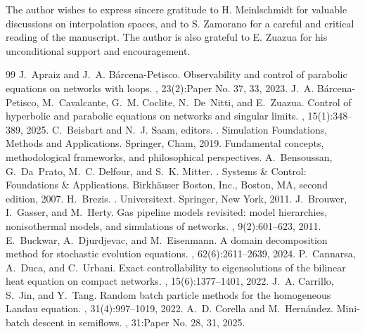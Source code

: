 \documentclass[10pt,a4paper]{amsart}
\begin{document}
The author wishes to express sincere gratitude to H. Meinlschmidt for valuable discussions on interpolation spaces, and to S. Zamorano for a careful and critical reading of the manuscript. The author is also grateful to E. Zuazua for his unconditional support and encouragement.

\begin{thebibliography}{99}
 J.~Apraiz and J.~A. B\'arcena-Petisco. \newblock Observability and control of parabolic equations on networks with loops. , 23(2):Paper No. 37, 33, 2023.
 J.~A. B{\'a}rcena-Petisco, M.~Cavalcante, G.~M. Coclite, N.~De~Nitti, and E.~Zuazua. \newblock Control of hyperbolic and parabolic equations on networks and singular limits. , 15(1):348--389, 2025.
 C.~Beisbart and N.~J. Saam, editors. . \newblock Simulation Foundations, Methods and Applications. Springer, Cham, 2019. \newblock Fundamental concepts, methodological frameworks, and philosophical perspectives.
 A.~Bensoussan, G.~Da~Prato, M.~C. Delfour, and S.~K. Mitter. . \newblock Systems \& Control: Foundations \& Applications. Birkh\"auser Boston, Inc., Boston, MA, second edition, 2007.
 H.~Brezis. . \newblock Universitext. Springer, New York, 2011.
 J.~Brouwer, I.~Gasser, and M.~Herty. \newblock Gas pipeline models revisited: model hierarchies, nonisothermal models, and simulations of networks. , 9(2):601--623, 2011.
 E.~Buckwar, A.~Djurdjevac, and M.~Eisenmann. \newblock A domain decomposition method for stochastic evolution equations. , 62(6):2611--2639, 2024.
 P.~Cannarsa, A.~Duca, and C.~Urbani. \newblock Exact controllability to eigensolutions of the bilinear heat equation on compact networks. , 15(6):1377--1401, 2022.
 J.~A. Carrillo, S.~Jin, and Y.~Tang. \newblock Random batch particle methods for the homogeneous {L}andau equation. , 31(4):997--1019, 2022.
 A.~D. Corella and M.~Hern\'andez. \newblock Mini-batch descent in semiflows. , 31:Paper No. 28, 31, 2025.

\end{thebibliography}
\end{document}
